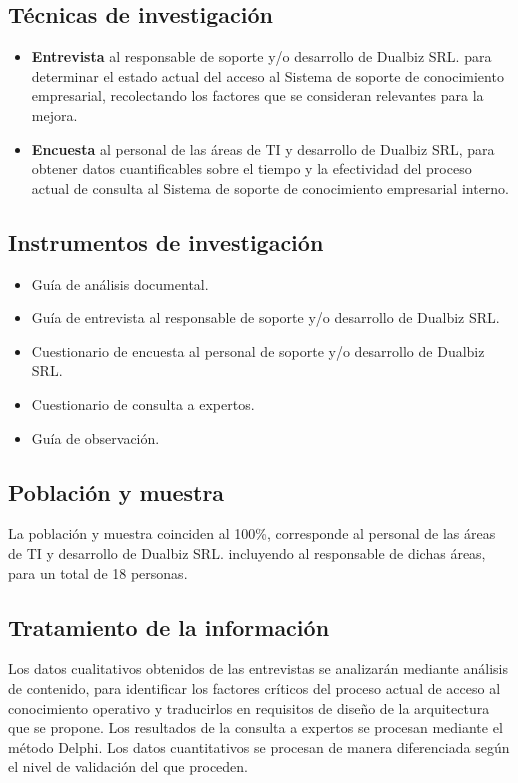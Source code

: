 \subsection{Técnicas de investigación}

\begin{itemize}
    \item \textbf{Entrevista} al responsable de soporte y/o desarrollo de Dualbiz SRL. para determinar el estado actual del acceso al Sistema de soporte de conocimiento empresarial, recolectando los factores que se consideran relevantes para la mejora.
    \item \textbf{Encuesta} al personal de las áreas de TI y desarrollo de Dualbiz SRL, para obtener datos cuantificables sobre el tiempo y la efectividad del proceso actual de consulta al Sistema de soporte de conocimiento empresarial interno.
\end{itemize}

\subsection{Instrumentos de investigación}

\begin{itemize}
    \item Guía de análisis documental.
    \item Guía de entrevista al responsable de soporte y/o desarrollo de Dualbiz SRL.
    \item Cuestionario de encuesta al personal de soporte y/o desarrollo de Dualbiz SRL.
    \item Cuestionario de consulta a expertos.
    \item Guía de observación.
\end{itemize}

\subsection{Población y muestra}

La población y muestra coinciden al 100\%, corresponde al personal de las áreas de TI y desarrollo de Dualbiz SRL. incluyendo al responsable de dichas áreas, para un total de 18 personas.

\subsection{Tratamiento de la información}
Los datos cualitativos obtenidos de las entrevistas se analizarán mediante análisis de contenido, para identificar los factores críticos del proceso actual de acceso al conocimiento operativo y traducirlos en requisitos de diseño de la arquitectura que se propone. Los resultados de la consulta a expertos se procesan mediante el método Delphi. Los datos cuantitativos se procesan de manera diferenciada según el nivel de validación del que proceden.

